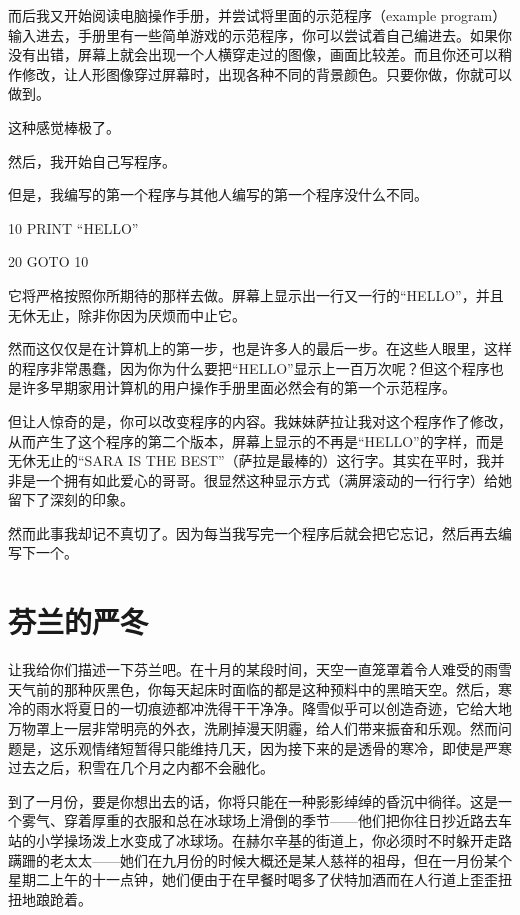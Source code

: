 \documentclass[12pt,UTF8]{ctexbook}
\begin{document}
而后我又开始阅读电脑操作手册，并尝试将里面的示范程序（example program）输入进去，手册里有一些简单游戏的示范程序，你可以尝试着自己编进去。如果你没有出错，屏幕上就会出现一个人横穿走过的图像，画面比较差。而且你还可以稍作修改，让人形图像穿过屏幕时，出现各种不同的背景颜色。只要你做，你就可以做到。

这种感觉棒极了。

然后，我开始自己写程序。

但是，我编写的第一个程序与其他人编写的第一个程序没什么不同。

10 PRINT “HELLO”

20 GOTO 10

它将严格按照你所期待的那样去做。屏幕上显示出一行又一行的“HELLO”，并且无休无止，除非你因为厌烦而中止它。

然而这仅仅是在计算机上的第一步，也是许多人的最后一步。在这些人眼里，这样的程序非常愚蠢，因为你为什么要把“HELLO”显示上一百万次呢？但这个程序也是许多早期家用计算机的用户操作手册里面必然会有的第一个示范程序。

但让人惊奇的是，你可以改变程序的内容。我妹妹萨拉让我对这个程序作了修改，从而产生了这个程序的第二个版本，屏幕上显示的不再是“HELLO”的字样，而是无休无止的“SARA IS THE BEST”（萨拉是最棒的）这行字。其实在平时，我并非是一个拥有如此爱心的哥哥。很显然这种显示方式（满屏滚动的一行行字）给她留下了深刻的印象。

然而此事我却记不真切了。因为每当我写完一个程序后就会把它忘记，然后再去编写下一个。

\section{芬兰的严冬}

让我给你们描述一下芬兰吧。在十月的某段时间，天空一直笼罩着令人难受的雨雪天气前的那种灰黑色，你每天起床时面临的都是这种预料中的黑暗天空。然后，寒冷的雨水将夏日的一切痕迹都冲洗得干干净净。降雪似乎可以创造奇迹，它给大地万物罩上一层非常明亮的外衣，洗刷掉漫天阴霾，给人们带来振奋和乐观。然而问题是，这乐观情绪短暂得只能维持几天，因为接下来的是透骨的寒冷，即使是严寒过去之后，积雪在几个月之内都不会融化。

到了一月份，要是你想出去的话，你将只能在一种影影绰绰的昏沉中徜徉。这是一个雾气、穿着厚重的衣服和总在冰球场上滑倒的季节——他们把你往日抄近路去车站的小学操场泼上水变成了冰球场。在赫尔辛基的街道上，你必须时不时躲开走路蹒跚的老太太——她们在九月份的时候大概还是某人慈祥的祖母，但在一月份某个星期二上午的十一点钟，她们便由于在早餐时喝多了伏特加酒而在人行道上歪歪扭扭地踉跄着。
\end{document}
